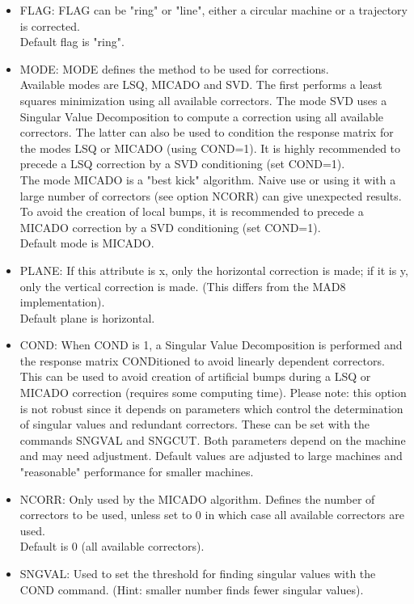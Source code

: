 \begin{itemize}
	\item FLAG: FLAG can be "ring" or "line", either a circular machine or a trajectory is corrected.  
\\ Default flag is "ring". 
	\item MODE: MODE defines the method to be used for corrections. 
\\ Available modes are LSQ, MICADO and SVD.  The first performs a least squares minimization using all available correctors. The mode SVD uses a Singular Value Decomposition to compute a correction using all available correctors. The latter can also be used to condition the response matrix for the modes LSQ or MICADO (using COND=1). It is highly recommended to precede a LSQ correction by a SVD conditioning (set COND=1). 
\\ The mode MICADO is a "best kick" algorithm. Naive use or using it with a large number of correctors (see option NCORR) can give unexpected results. To avoid the creation of local bumps, it is recommended to precede a MICADO correction by a SVD conditioning (set COND=1). 
\\ Default mode is MICADO.            
	\item PLANE: If this attribute is x, only the horizontal correction is made; if it is y, only the vertical correction is made. (This differs from the MAD8 implementation). 
\\ Default plane is horizontal. 
	\item COND: When COND is 1, a Singular Value Decomposition is performed and  the response matrix CONDitioned to avoid linearly dependent correctors. This can be used to avoid creation of artificial bumps during a LSQ or MICADO correction (requires some computing time).  Please note: this option is not robust since it depends on parameters which control the determination of singular values and redundant correctors. These can be set with the commands SNGVAL and SNGCUT. Both parameters depend on the machine and may need adjustment. Default values are adjusted to large machines and "reasonable" performance for smaller machines. 
\\
	\item NCORR: Only used by the MICADO algorithm. Defines the number of correctors to be used, unless set to 0 in which case all available correctors are used. 
\\ Default is 0 (all available correctors). 
	\item SNGVAL:  Used to set the threshold for finding singular values with the COND command. (Hint: smaller number finds fewer singular values). 

\end{itemize}
